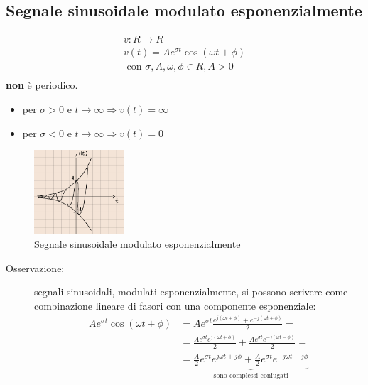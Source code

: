 \documentclass[a4paper, 12pt]{book}
\theoremstyle{plain}
\begin{document}
\subsection{Segnale sinusoidale modulato esponenzialmente}

\begin{gather}
    v : R \rightarrow R\\
    v(t) = A e^{\sigma t} \cos (\omega t + \phi)\\
    \textrm{ con } \sigma, A, \omega, \phi \in R, A > 0\\
\end{gather}
 \textbf{non} è periodico.   

\begin{itemize}
    \item per $\sigma > 0$ e $t \rightarrow \infty \Rightarrow v(t) = \infty$
    \item per $\sigma < 0$ e $t \rightarrow \infty \Rightarrow v(t) = 0$
\end{itemize}

\begin{figure}
    \includegraphics[width=0.3\textwidth]{nomelunghissimo.png}
    \caption{Segnale sinusoidale modulato esponenzialmente}
\end{figure}

\begin{description}
    \item[Osservazione: ] segnali sinusoidali, modulati esponenzialmente, si possono scrivere come combinazione lineare di fasori con una componente esponenziale: \[
        \begin{split}
            A e^{\sigma t} \cos (\omega t + \phi) &= A e^{\sigma t} \frac{e^{j(\omega t + \phi)} + e^{-j(\omega t + \phi)}}{2} = \\
            &= \frac{A e^{\sigma t} e^{j(\omega t + \phi)}}{2} + \frac{A e^{\sigma t} e^{-j(\omega t - \phi)}}{2} = \\
            &= \underbrace{\frac{A}{2} e^{\sigma t} e^{j\omega t + j\phi} + \frac{A}{2} e^{\sigma t} e^{-j\omega t - j\phi}}_{\textrm{sono complessi coniugati}}
        \end{split}
         \] 
\end{description}
\end{document}
